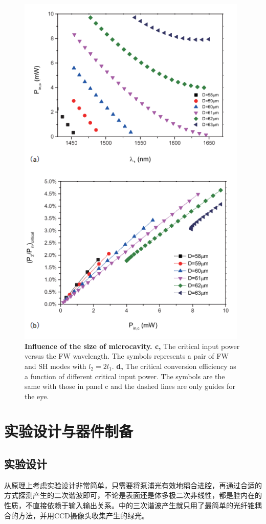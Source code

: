 \documentclass[UTF8,a4paper,cs4size,hyperref]{ctexart}
\begin{document}
\begin{figure}
\includegraphics[width=11cm]{P2change_ed2_aicd}
\centering
\caption{\textbf{Influence of the size of microcavity. c,} The critical input power versus the FW wavelength. The symbols represents a pair of FW and SH modes with $l_2=2l_1$.  \textbf{d, }The critical conversion efficiency as a function of different critical input power. The symbols are the same with those in panel c and the dashed lines are only guides for the eye. }
\label{pic:P2change_ed2_aicd}
\end{figure}

\section{实验设计与器件制备}
\subsection{实验设计}
\label{sec:ExpSetup}

从原理上考虑实验设计非常简单，只需要将泵浦光有效地耦合进腔，再通过合适的方式探测产生的二次谐波即可，不论是表面还是体多极二次非线性，都是腔内在的性质，不直接依赖于输入输出关系。\cite{carmon2007visible}中的三次谐波产生就只用了最简单的光纤锥耦合的方法，并用CCD摄像头收集产生的绿光。
\end{document}
